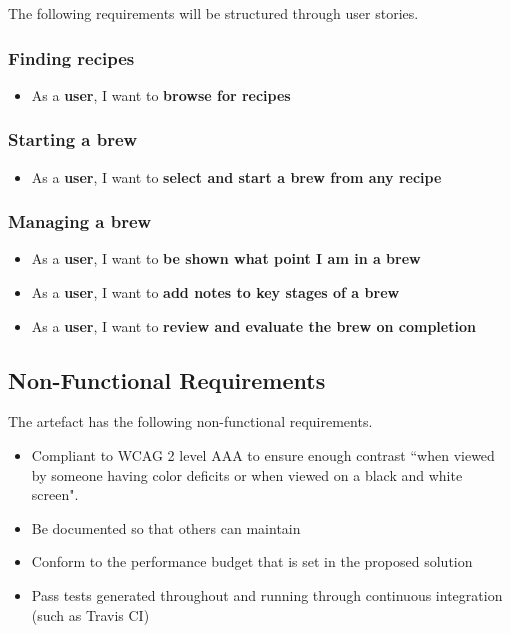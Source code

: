 The following requirements will be structured through user stories. %

\subsubsection{Finding recipes}

\begin{itemize}
  \item As a \textbf{user}, I want to \textbf{browse for recipes}
\end{itemize}

\subsubsection{Starting a brew}

\begin{itemize}
  \item As a \textbf{user}, I want to \textbf{select and start a brew from any recipe}
\end{itemize}

\subsubsection{Managing a brew}

\begin{itemize}
  \item As a \textbf{user}, I want to \textbf{be shown what point I am in a brew}
  \item As a \textbf{user}, I want to \textbf{add notes to key stages of a brew}
  \item As a \textbf{user}, I want to \textbf{review and evaluate the brew on completion}
\end{itemize}

\subsection{Non-Functional Requirements} \label{a-d--requirements--non-functional}

The artefact has the following non-functional requirements.

\begin{itemize}
  \item Compliant to WCAG 2 level AAA to ensure enough contrast ``when viewed by someone having color deficits or when viewed on a black and white screen". \cite{colour_contrast}
  \item Be documented so that others can maintain
  \item Conform to the performance budget that is set in the proposed solution
  \item Pass tests generated throughout and running through continuous integration (such as Travis CI)
\end{itemize}

